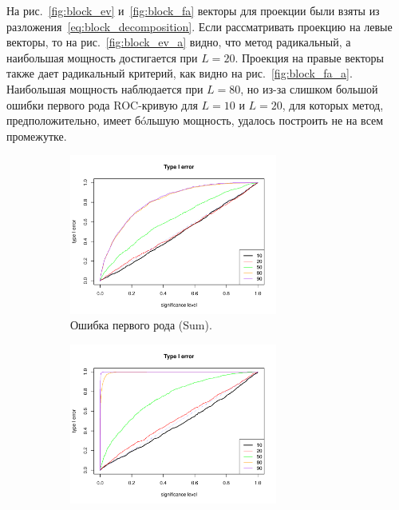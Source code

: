 \documentclass[specialist,
substylefile = spbu_report.rtx,
subf,href,colorlinks=true, 12pt]{disser}
\theoremstyle{definition}
\begin{document}
На рис.~\ref{fig:block_ev} и~\ref{fig:block_fa} векторы для проекции были взяты из разложения~\eqref{eq:block_decomposition}. Если рассматривать проекцию на левые векторы, то на рис.~\ref{fig:block_ev_a} видно, что метод радикальный, а наибольшая мощность достигается при $L=20$. Проекция на правые векторы также дает радикальный критерий, как видно на рис.~\ref{fig:block_fa_a}. Наибольшая мощность наблюдается при $L=80$, но из-за слишком большой ошибки первого рода ROC-кривую для $L=10$ и $L=20$, для которых метод, предположительно, имеет б\'oльшую мощность, удалось построить не на всем промежутке.
\begin{figure}
	\captionsetup[subfigure]{justification=Centering}
	\begin{subfigure}[t]{0.45\textwidth}
		\centering
		\includegraphics[width=0.75\textwidth]{img/type1error_sum_ev.pdf}
		\caption{Ошибка первого рода (Sum).}
		\label{fig:sum_ev_a}
	\end{subfigure}\hspace{\fill}
	\begin{subfigure}[t]{0.45\textwidth}
		\centering
		\includegraphics[width=0.75\textwidth]{img/type1error_mssa_ev.pdf}

\end{subfigure}
\end{figure}
\end{document}
